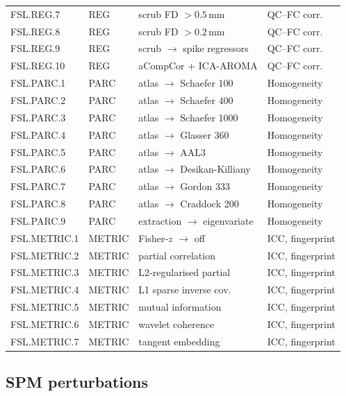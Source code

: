\documentclass[11pt,a4paper]{article}
\begin{document}
\begin{longtable}{@{}llll@{}}
FSL.REG.7  & REG & scrub FD $> 0.5$\,mm          & QC--FC corr. \\
FSL.REG.8  & REG & scrub FD $> 0.2$\,mm          & QC--FC corr. \\
FSL.REG.9  & REG & scrub $\to$ spike regressors  & QC--FC corr. \\
FSL.REG.10 & REG & aCompCor + ICA-AROMA          & QC--FC corr. \\
\midrule
FSL.PARC.1  & PARC & atlas $\to$ Schaefer 100    & Homogeneity \\
FSL.PARC.2  & PARC & atlas $\to$ Schaefer 400    & Homogeneity \\
FSL.PARC.3  & PARC & atlas $\to$ Schaefer 1000   & Homogeneity \\
FSL.PARC.4  & PARC & atlas $\to$ Glasser 360     & Homogeneity \\
FSL.PARC.5  & PARC & atlas $\to$ AAL3            & Homogeneity \\
FSL.PARC.6  & PARC & atlas $\to$ Desikan-Killiany & Homogeneity \\
FSL.PARC.7  & PARC & atlas $\to$ Gordon 333      & Homogeneity \\
FSL.PARC.8  & PARC & atlas $\to$ Craddock 200    & Homogeneity \\
FSL.PARC.9  & PARC & extraction $\to$ eigenvariate & Homogeneity \\
\midrule
FSL.METRIC.1 & METRIC & Fisher-$z$ $\to$ off     & ICC, fingerprint \\
FSL.METRIC.2 & METRIC & partial correlation       & ICC, fingerprint \\
FSL.METRIC.3 & METRIC & L2-regularised partial    & ICC, fingerprint \\
FSL.METRIC.4 & METRIC & L1 sparse inverse cov.    & ICC, fingerprint \\
FSL.METRIC.5 & METRIC & mutual information        & ICC, fingerprint \\
FSL.METRIC.6 & METRIC & wavelet coherence         & ICC, fingerprint \\
FSL.METRIC.7 & METRIC & tangent embedding         & ICC, fingerprint \\
\end{longtable}


\subsection{SPM perturbations}
\end{document}
